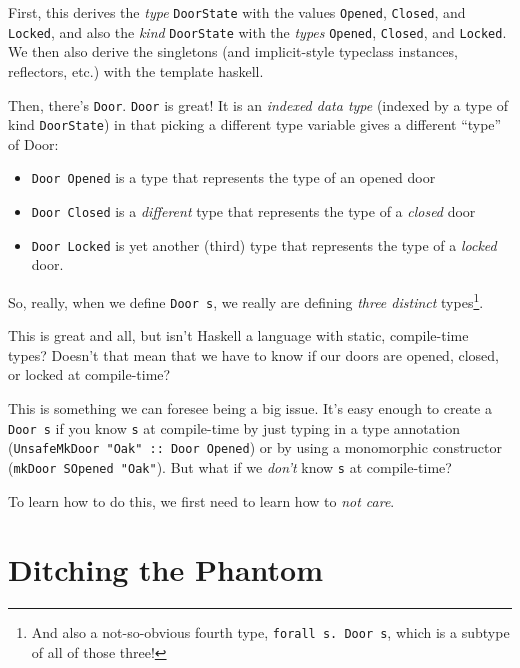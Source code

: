 \documentclass[]{article}
\begin{document}
First, this derives the \emph{type} \texttt{DoorState} with the values
\texttt{Opened}, \texttt{Closed}, and \texttt{Locked}, and also the \emph{kind}
\texttt{DoorState} with the \emph{types} \texttt{\textquotesingle{}Opened},
\texttt{\textquotesingle{}Closed}, and \texttt{\textquotesingle{}Locked}. We
then also derive the singletons (and implicit-style typeclass instances,
reflectors, etc.) with the template haskell.

Then, there's \texttt{Door}. \texttt{Door} is great! It is an \emph{indexed data
type} (indexed by a type of kind \texttt{DoorState}) in that picking a different
type variable gives a different ``type'' of Door:

\begin{itemize}
\tightlist
\item
  \texttt{Door\ \textquotesingle{}Opened} is a type that represents the type of
  an opened door
\item
  \texttt{Door\ \textquotesingle{}Closed} is a \emph{different} type that
  represents the type of a \emph{closed} door
\item
  \texttt{Door\ \textquotesingle{}Locked} is yet another (third) type that
  represents the type of a \emph{locked} door.
\end{itemize}

So, really, when we define \texttt{Door\ s}, we really are defining \emph{three
distinct} types\footnote{And also a not-so-obvious fourth type,
  \texttt{forall\ s.\ Door\ s}, which is a subtype of all of those three!}.

This is great and all, but isn't Haskell a language with static, compile-time
types? Doesn't that mean that we have to know if our doors are opened, closed,
or locked at compile-time?

This is something we can foresee being a big issue. It's easy enough to create a
\texttt{Door\ s} if you know \texttt{s} at compile-time by just typing in a type
annotation (\texttt{UnsafeMkDoor\ "Oak"\ ::\ Door\ \textquotesingle{}Opened}) or
by using a monomorphic constructor (\texttt{mkDoor\ SOpened\ "Oak"}). But what
if we \emph{don't} know \texttt{s} at compile-time?

To learn how to do this, we first need to learn how to \emph{not care}.

\section{Ditching the Phantom}\label{ditching-the-phantom}
\end{document}
